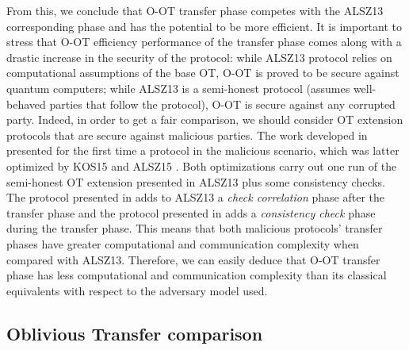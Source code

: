 

From this, we conclude that O-OT transfer phase competes with the ALSZ13 corresponding phase and has the potential to be more efficient. It is important to stress that O-OT efficiency performance of the transfer phase comes along with a drastic increase in the security of the protocol: while ALSZ13 protocol relies on computational assumptions of the base OT, O-OT is proved to be secure against quantum computers; while ALSZ13 is a semi-honest protocol (assumes well-behaved parties that follow the protocol), O-OT is secure against any corrupted party. Indeed, in order to get a fair comparison, we should consider OT extension protocols that are secure against malicious parties. The work developed in \cite{IKNP03} presented for the first time a protocol in the malicious scenario, which was latter optimized by KOS15 \cite{KOS15} and ALSZ15 \cite{ALSZ15}. Both optimizations carry out one run of the semi-honest OT extension presented in ALSZ13 plus some consistency checks. The protocol presented in \cite{KOS15} adds to ALSZ13 a \textit{check correlation} phase after the transfer phase and the protocol presented in \cite{ALSZ15} adds a \textit{consistency check} phase during the transfer phase. This means that both malicious protocols' transfer phases have greater computational and communication complexity when compared with ALSZ13. Therefore, we can easily deduce that O-OT transfer phase has less computational and communication complexity than its classical equivalents with respect to the adversary model used.


\subsection{Oblivious Transfer comparison}

